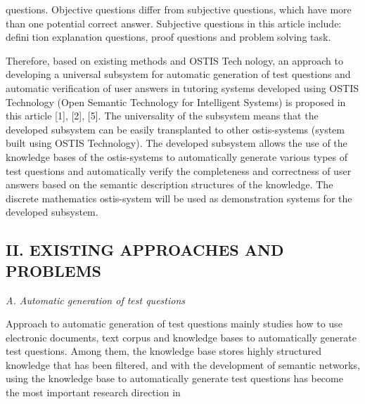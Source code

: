 \documentclass{article}
\begin{document}
\begin{multicols}{2}
questions. Objective questions differ from subjective
questions, which have more than one potential correct
answer. Subjective questions in this article include: definition explanation questions, proof questions and problemsolving task.
\par Therefore, based on existing methods and OSTIS Technology, an approach to developing a universal subsystem
for automatic generation of test questions and automatic
verification of user answers in tutoring systems developed
using OSTIS Technology (Open Semantic Technology
for Intelligent Systems) is proposed in this article [1],
[2], [5]. The universality of the subsystem means that the
developed subsystem can be easily transplanted to other
ostis-systems (system built using OSTIS Technology). The
developed subsystem allows the use of the knowledge
bases of the ostis-systems to automatically generate
various types of test questions and automatically verify
the completeness and correctness of user answers based
on the semantic description structures of the knowledge.
The discrete mathematics ostis-system will be used as
demonstration systems for the developed subsystem.

\begin{center}
\chapter{II. EXISTING APPROACHES AND PROBLEMS}
\end{center}
\vspace{-4pt}
\textit{A. Automatic generation of test questions}
\vspace{5pt}
\par Approach to automatic generation of test questions
mainly studies how to use electronic documents, text
corpus and knowledge bases to automatically generate
test questions. Among them, the knowledge base stores
highly structured knowledge that has been filtered, and
with the development of semantic networks, using the
knowledge base to automatically generate test questions
has become the most important research direction in
\end{multicols}
\end{document}

